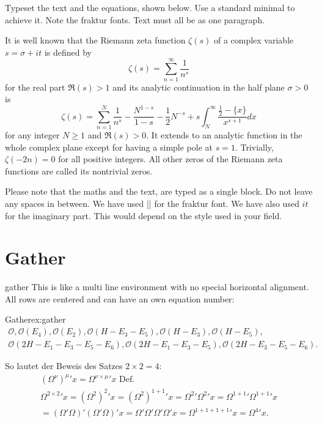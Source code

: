 {\begin{casestudy}{%
Typeset the text and the equations, shown below. Use a standard minimal to achieve it. Note the fraktur fonts. Text must all be as one paragraph.}
\begin{teX}
It is well known that the Riemann zeta function $\zeta(s)$ of a complex variable $s=\sigma+it$ is defined by
\[
\zeta(s)=\sum_{n=1}^{\infty}\frac{1}{n^{s}}
\]
for the real part $\mathfrak{R}(s)>1$ and its analytic continuation in the half plane $\sigma>0$ is
\begin{equation}\label{func:zeta}
\zeta(s)=\sum_{n=1}^{N}\frac{1}{n^{s}}-\frac{N^{1-s}}{1-s}-\frac{1}{2}N^{-s}
+s\int_{N}^{\infty}\frac{\frac{1}{2}-\{x\}}{x^{s+1}}dx
\end{equation}
for any integer $N\geq1$ and $\mathfrak{R}(s)>0$.
It extends to an analytic function in the whole complex plane except for having a simple pole at $s=1$. Trivially, $\zeta(-2n)=0$ for all positive integers. All other zeros of the Riemann zeta functions are called its nontrivial zeros.
\end{teX}

Please note that the maths and the text, are typed as a single block. Do not leave any spaces in between. We have used |\mathfrak| for the fraktur font. We have also used $it$ for the imaginary part. This would depend on the style used in your field. 
\end{casestudy}

\clearpage
\section{Gather}

\begin{docEnvironment}{gather}{}
This is like a multi line environment with no special horizontal alignment. All rows
are centered and can have an own equation number:
\end{docEnvironment}

\begin{texexample}{Gather}{ex:gather}
\def\O{\mathcal{O}}
\begin{gather}
 \O,\O(E_4),\O(E_2),\O(H-E_3-E_5),\O(H-E_3),\O(H-E_5),\\ 
\O(2H-E_1-E_3-E_5-E_6),\O(2H-E_1-E_3-E_5),\O(2H-E_3-E_5-E_6).
\end{gather}

So lautet der Beweis des Satzes $2 \times 2 = 4$:
\begin{gather}
(\Omega^{\nu})^{\mu}{}'x = \Omega^{\nu \times \mu}{}'x \text{ Def.}\\
\Omega^{2 \times 2}{}'x = (\Omega^{2})^{2}{}'x = (\Omega^{2})^{1 + 1}{}'x = \Omega^{2}{}'\Omega^{2}{}'x = \Omega^{1 + 1}{}'\Omega^{1 + 1}{}'x\nonumber \\
= (\Omega'\Omega)'(\Omega'\Omega)'x = \Omega'\Omega'\Omega'\Omega'x = \Omega^{1 + 1 + 1 + 1}{}'x = \Omega^{4}{}'x.
\end{gather}



\end{texexample}}
